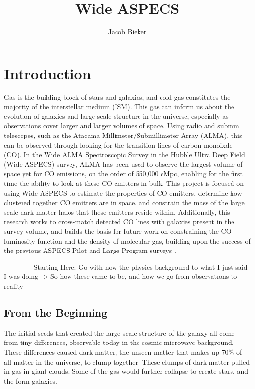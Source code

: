 \documentclass[twoside,single]{lion-msc}
\title{Wide ASPECS}
\author{Jacob Bieker}
\affiliation{Leiden Observatory, Leiden University}
\begin{document}
\maketitle

\tableofcontents
\cleardoublepage

\chapter{Introduction}

Gas is the building block of stars and galaxies, and cold gas constitutes the majority of the interstellar medium (ISM). This gas can inform us about the evolution of galaxies and large scale structure in the universe, especially as observations cover larger and larger volumes of space. Using radio and submm telescopes, such as the Atacama Millimeter/Submillimeter Array (ALMA), this can be observed through looking for the transition lines of carbon monoixde (CO). In the Wide ALMA Spectroscopic Survey in the Hubble Ultra Deep Field (Wide ASPECS) survey, ALMA has been used to observe the largest volume of space yet for CO emissions, on the order of 550,000 cMpc, enabling for the first time the ability to look at these CO emitters in bulk. 
This project is focused on using Wide ASPECS to estimate the properties of CO emitters, determine how clustered together CO emitters are in space, and constrain the mass of the large scale dark matter halos that these emitters reside within. Additionally, this research works to cross-match detected CO lines with galaxies present in the survey volume, and builds the basis for future work on constraining the CO luminosity function and the density of molecular gas, building upon the success of the previous ASPECS Pilot and Large Program surveys \cite{walter2016alma, decarli2019alma}. 

------------ Starting Here: Go with now the physics background to what I just said I was doing -> So how these came to be, and how we go from observations to reality

\section{From the Beginning}

The initial seeds that created the large scale structure of the galaxy all come from tiny differences, observable today in the cosmic microwave background. These differences caused dark matter, the unseen matter that makes up 70\% of all matter in the universe, to clump together. These clumps of dark matter pulled in gas in giant clouds. Some of the gas would further collapse to create stars, and the form galaxies.
\end{document}
